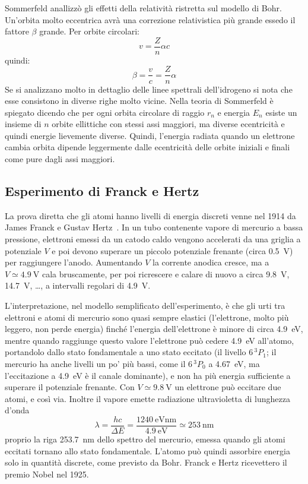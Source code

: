 Sommerfeld anallizzò gli effetti della relatività ristretta sul modello di Bohr. Un'orbita molto eccentrica avrà una correzione relativistica più grande essedo il fattore $\beta$ grande. Per orbite circolari:
\begin{equation}
	v=\frac{Z}{n}\alpha c
\end{equation}
quindi:
\begin{equation}
	\beta=\frac{v}{c}=\frac{Z}{n}\alpha
	\label{betabohr}
\end{equation}
Se si analizzano molto in dettaglio delle linee spettrali dell'idrogeno si nota che esse consistono in diverse righe molto vicine. Nella teoria di Sommerfeld è spiegato dicendo che per ogni orbita circolare di raggio $r_n$ e energia $E_n$ esiste un insieme di $n$ orbite ellittiche con stessi assi maggiori, ma diverse ecentricità e quindi energie lievemente diverse. Quindi, l'energia radiata quando un elettrone cambia orbita dipende leggermente dalle ecentricità delle orbite iniziali e finali come pure dagli assi maggiori.
\subsection{Esperimento di Franck e Hertz}
La prova diretta che gli atomi hanno livelli di energia discreti venne nel 1914 da James Franck e Gustav Hertz~\cite{franckhertz1914}. In un tubo contenente vapore di mercurio a bassa pressione, elettroni emessi da un catodo caldo vengono accelerati da una griglia a potenziale $V$ e poi devono superare un piccolo potenziale frenante (circa \SI{0.5}{\volt}) per raggiungere l'anodo. Aumentando $V$ la corrente anodica cresce, ma a $V\simeq\SI{4.9}{\volt}$ cala bruscamente, per poi ricrescere e calare di nuovo a circa \SI{9.8}{\volt}, \SI{14.7}{\volt}, \ldots, a intervalli regolari di \SI{4.9}{\volt}.

L'interpretazione, nel modello semplificato dell'esperimento, è che gli urti tra elettroni e atomi di mercurio sono quasi sempre elastici (l'elettrone, molto più leggero, non perde energia) finché l'energia dell'elettrone è minore di circa \SI{4.9}{\electronvolt}, mentre quando raggiunge questo valore l'elettrone può cedere \SI{4.9}{\electronvolt} all'atomo, portandolo dallo stato fondamentale a uno stato eccitato (il livello $6\,{}^3P_1$; il mercurio ha anche livelli un po' più bassi, come il $6\,{}^3P_0$ a \SI{4.67}{\electronvolt}, ma l'eccitazione a \SI{4.9}{\electronvolt} è il canale dominante), e non ha più energia sufficiente a superare il potenziale frenante. Con $V\simeq\SI{9.8}{\volt}$ un elettrone può eccitare due atomi, e così via. Inoltre il vapore emette radiazione ultravioletta di lunghezza d'onda
\[
  \lambda=\frac{hc}{\Delta E}=\frac{\SI{1240}{\electronvolt\nano\meter}}{\SI{4.9}{\electronvolt}}\simeq\SI{253}{\nano\meter}
\]
proprio la riga \SI{253.7}{\nano\meter} dello spettro del mercurio, emessa quando gli atomi eccitati tornano allo stato fondamentale. L'atomo può quindi assorbire energia solo in quantità discrete, come previsto da Bohr. Franck e Hertz ricevettero il premio Nobel nel 1925.

